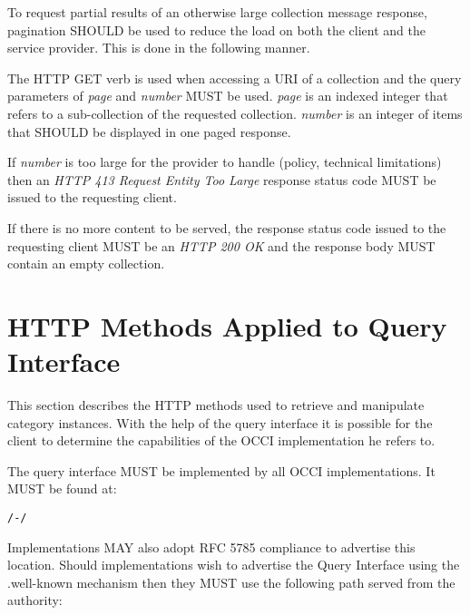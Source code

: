 \documentclass[10pt,a4paper]{article}
\begin{document}
To request partial results of an otherwise large collection message response, pagination SHOULD be used to reduce the load on
both the client and the service provider. This is done in the following manner.

The HTTP GET verb is used when accessing a URI of a collection and the query parameters of {\em page} and {\em number} MUST be used. {\em page} is an indexed
integer that refers to a sub-collection of the requested collection. {\em number} is an integer of items that SHOULD be displayed in one paged response.


If {\em number} is too large for the provider to handle (policy, technical limitations) then an \emph{HTTP 413 Request Entity Too Large} response status code MUST be issued to the requesting client.

If there is no more content to be served, the response status code issued to the requesting client MUST be an \emph{HTTP 200 OK} and the response body MUST contain an empty collection.

\section{HTTP Methods Applied to Query Interface}





This section describes the HTTP methods used to retrieve and manipulate category instances.  With the help of the query interface it is possible for the client to determine the capabilities of the OCCI implementation he refers to.

The query interface MUST be implemented by all OCCI implementations. It MUST be found at:

\begin{verbatim}
/-/
\end{verbatim}

Implementations MAY also adopt RFC 5785 \cite{rfc5785} compliance to advertise this location. Should implementations wish to advertise the Query Interface using the .well-known mechanism then they MUST use the following path served from the authority:
\end{document}
